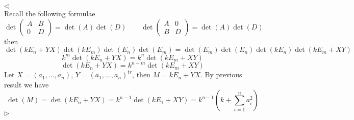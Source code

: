 \documentclass[12pt]{article}
\newenvironment{solution}{\par $\triangleleft$}{$\triangleright$}
\begin{document}
\begin{solution}
$$$$
Recall the following formulae
$$
\det\begin{pmatrix} A&B\\0&D\end{pmatrix}=\det(A)\det(D)\qquad
\det\begin{pmatrix} A&0\\B&D\end{pmatrix}=\det(A)\det(D)\qquad
$$
then
$$
\det(kE_n+YX)\det(kE_m)\det(E_n)\det(E_m)
=
\det(E_m)\det(E_n)\det(kE_n)\det(kE_m+XY)
$$
$$
k^m\det(kE_n+YX)=k^{n}\det(kE_m+XY)
$$
$$
\det(kE_n+YX)=k^{n-m}\det(kE_m+XY)
$$
Let $X=(a_1,\ldots,a_n)$, $Y=(a_1,\ldots,a_n)^{tr}$, then $M=k E_n+YX$. By previous result we have
$$
\det(M)=\det(kE_n+YX)=k^{n-1}\det(kE_1+XY)=k^{n-1}\left(k+\sum_{i=1}^n a_i^2\right)
$$
\end{solution}
 
\end{document}
